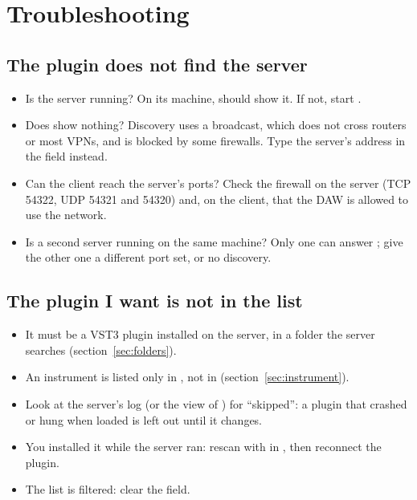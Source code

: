 \chapter{Troubleshooting}
\label{ch:troubleshooting}

\section{The plugin does not find the server}

\begin{itemize}
  \item Is the server running? On its machine,  should show
    it. If not, start .
  \item Does  show nothing? Discovery uses a broadcast, which does not
    cross routers or most VPNs, and is blocked by some firewalls. Type the
    server's address in the field instead.
  \item Can the client reach the server's ports? Check the firewall on the
    server (TCP 54322, UDP 54321 and 54320) and, on the client, that the
    DAW is allowed to use the network.
  \item Is a second server running on the same machine? Only one can answer
    ; give the other one a different port set, or no discovery.
\end{itemize}

\section{The plugin I want is not in the list}

\begin{itemize}
  \item It must be a VST3 plugin installed on the server, in a folder
    the server searches (section~\ref{sec:folders}).
  \item An instrument is listed only in , not in
     (section~\ref{sec:instrument}).
  \item Look at the server's log (or the  view of
    ) for ``skipped'': a plugin that crashed or hung when
    loaded is left out until it changes.
  \item You installed it while the server ran: rescan with  in
    , then reconnect the plugin.
  \item The list is filtered: clear the  field.
\end{itemize}

